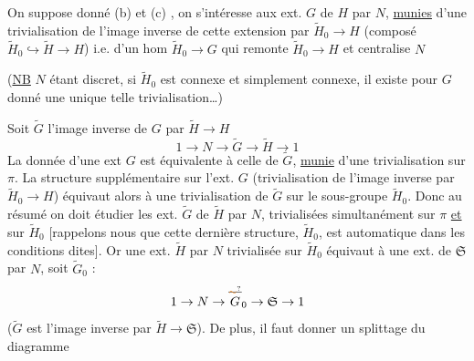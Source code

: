 On suppose donné (b) et (c) , on s'intéresse aux ext. $G$ de $H$ par $N$, \uline{munies} d'une trivialisation  de l'image inverse de cette extension par $\widetilde H_0\to H$ (composé $\widetilde H_0\hookrightarrow\widetilde H\to H$) i.e. d'un hom $\widetilde H_0\to G$ qui remonte $\widetilde H_0\to H$ et centralise $N$

(\uline{NB} $N$ étant discret, si $\widetilde H_0$ est connexe et simplement connexe, il existe pour $G$ donné une unique telle trivialisation\ldots)

Soit $\widetilde G$ l'image inverse de $G$ par $\widetilde H\to H$
\[
1\to N\to\widetilde G\to\widetilde H\to1
\]
La donnée d'une ext $G$ est équivalente à celle de $\widetilde G$, \uline{munie} d'une trivialisation  sur $\pi$. La  structure supplémentaire sur l'ext. $G$ (trivialisation de l'image inverse par $\widetilde H_0\to H$) équivaut alors à une trivialisation  de $\widetilde G$ sur le sous-groupe $\widetilde H_0$. Donc au résumé on doit étudier les ext. $\widetilde G$ de $\widetilde H$ par $N$, trivialisées  simultanément sur $\pi$ \uline{et} sur $\widetilde H_0$ [rappelons nous que cette dernière structure,   $\widetilde H_0$, est automatique dans les conditions dites]. Or une ext.   $\widetilde H$ par $N$ trivialisée  sur $\widetilde H_0$ équivaut à une ext. de $\mathfrak S$ par $N$, soit $\widetilde G_0$ :
\[
1\to N\to\overset{\deleted{\unsure{\sim}}}{G}_0\to\mathfrak S\to1
\]
($\widetilde G$ est l'image inverse par $\widetilde H\to\mathfrak S$). De plus, il faut donner un splittage  du diagramme
